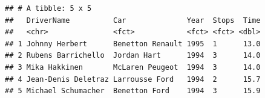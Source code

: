 \documentclass[oneside,11pt]{Latex/Classes/PhDthesisPSnPDF}
\begin{document}
\begin{verbatim}
## # A tibble: 5 x 5
##   DriverName          Car              Year  Stops  Time
##   <chr>               <fct>            <fct> <fct> <dbl>
## 1 Johnny Herbert      Benetton Renault 1995  1      13.0
## 2 Rubens Barrichello  Jordan Hart      1994  3      14.0
## 3 Mika Hakkinen       McLaren Peugeot  1994  3      14.0
## 4 Jean-Denis Deletraz Larrousse Ford   1994  2      15.7
## 5 Michael Schumacher  Benetton Ford    1994  3      15.9
\end{verbatim}

\renewcommand{\bibname}{Lista de Referencias}
 
 

\end{document}
